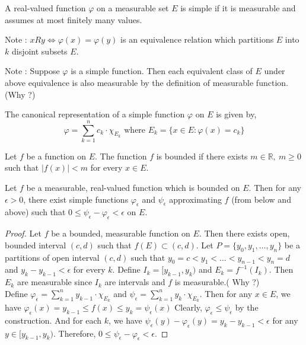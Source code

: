 \begin{definition}
	A real-valued function $\varphi$ on a measurable set $E$ is simple if it is measurable and assumes at most finitely many values.
\end{definition}

Note : $xRy \iff \varphi(x) = \varphi(y)$ is an equivalence relation which partitions $E$ into $k$ disjoint subsets $E$.

Note : Suppose $\varphi$ is a simple function.
Then each equivalent class of $E$ under above equivalence is also measurable by the definition of measurable function.(Why ?)

\begin{definition}
	The canonical representation of a simple function $\varphi$ on $E$ is given by,
	\begin{equation}
		\varphi = \sum_{k=1}^n c_k \cdot \chi_{E_k} \text{ where } E_k = \{ x \in E : \varphi(x) = c_k \} 
	\end{equation}
\end{definition}

\begin{definition}[bounded]
	Let $f$ be a function on $E$.
	The function $f$ is bounded if there exists $m \in \mathbb{R},\ m \ge 0$ such that $|f(x)| < m$ for every $x \in E$.
\end{definition}

\begin{lemma}
	Let $f$ be a measurable, real-valued function which is bounded on $E$.
	Then for any $\epsilon > 0$, there exist simple functions $\varphi_\epsilon$ and $\psi_\epsilon$  approximating $f$ (from below and above) such that $0 \le \psi_\epsilon - \varphi_\epsilon < \epsilon$ on $E$.
\end{lemma}
\begin{proof}
	Let $f$ be a bounded, measurable function on $E$.
	Then there exists open, bounded interval $(c,d)$ such that $f(E) \subset (c,d)$.
	Let $P = \{y_0,y_1,\dots,y_n\}$ be a partitions of open interval $(c,d)$ such that $y_0 =c < y_1 < \dots < y_{n-1} < y_n = d$ and $y_k - y_{k-1} < \epsilon$ for every $k$.
	Define $I_k = [y_{k-1},y_k)$ and $E_k = f^{-1}(I_k)$.
	Then $E_k$ are measurable since $I_k$ are intervals and $f$ is measurable.({ \color{blue}Why ?})\\

	Define $\displaystyle \varphi_\epsilon = \sum_{k=1}^n y_{k-1} \cdot \chi_{E_k}$ and $\displaystyle \psi_\epsilon = \sum_{k=1}^n y_k \cdot \chi_{E_k}$.
	Then for any $x \in E$, we have $\varphi_\epsilon(x) = y_{k-1} \le f(x) \le y_k = \psi_\epsilon(x)$
	Clearly, $\varphi_\epsilon \le \psi_\epsilon$ by the construction.
	And for each $k$, we have $\psi_\epsilon(y) - \varphi_\epsilon(y) = y_k - y_{k-1} < \epsilon$ for any $y \in [y_{k-1},y_k)$.
	Therefore, $0 \le \psi_\epsilon - \varphi_\epsilon < \epsilon$.
\end{proof}

